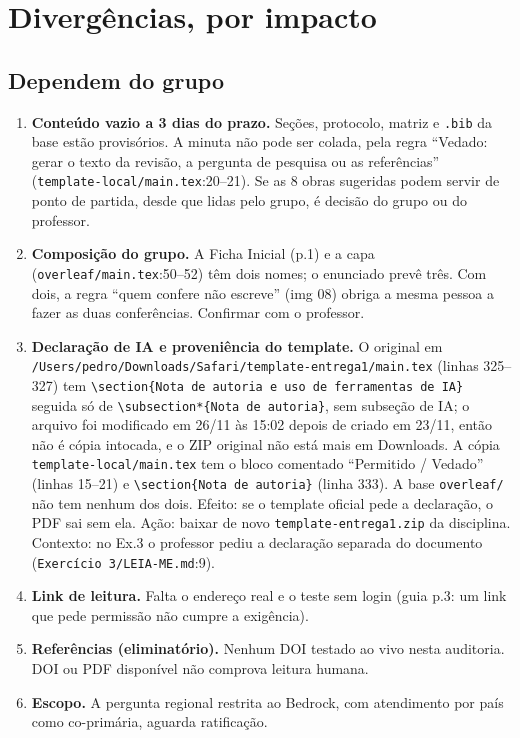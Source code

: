 \documentclass[11pt,a4paper]{article}
\newcommand{\arq}[1]{\nolinkurl{#1}}
\begin{document}
\section{Divergências, por impacto}

\subsection*{Dependem do grupo}

\begin{enumerate}
\item \textbf{Conteúdo vazio a 3 dias do prazo.} Seções, protocolo, matriz e \texttt{.bib} da base estão provisórios. A minuta não pode ser colada, pela regra ``Vedado: gerar o texto da revisão, a pergunta de pesquisa ou as referências'' (\arq{template-local/main.tex}:20--21). Se as 8 obras sugeridas podem servir de ponto de partida, desde que lidas pelo grupo, é decisão do grupo ou do professor.
\item \textbf{Composição do grupo.} A Ficha Inicial (p.1) e a capa (\arq{overleaf/main.tex}:50--52) têm dois nomes; o enunciado prevê três. Com dois, a regra ``quem confere não escreve'' (img 08) obriga a mesma pessoa a fazer as duas conferências. Confirmar com o professor.
\item \textbf{Declaração de IA e proveniência do template.} O original em \arq{/Users/pedro/Downloads/Safari/template-entrega1/main.tex} (linhas 325--327) tem \texttt{\textbackslash section\{Nota de autoria e uso de ferramentas de IA\}} seguida só de \texttt{\textbackslash subsection*\{Nota de autoria\}}, sem subseção de IA; o arquivo foi modificado em 26/11 às 15:02 depois de criado em 23/11, então não é cópia intocada, e o ZIP original não está mais em Downloads. A cópia \arq{template-local/main.tex} tem o bloco comentado ``Permitido / Vedado'' (linhas 15--21) e \texttt{\textbackslash section\{Nota de autoria\}} (linha 333). A base \arq{overleaf/} não tem nenhum dos dois. Efeito: se o template oficial pede a declaração, o PDF sai sem ela. Ação: baixar de novo \arq{template-entrega1.zip} da disciplina. Contexto: no Ex.3 o professor pediu a declaração separada do documento (\arq{Exercício 3/LEIA-ME.md}:9).
\item \textbf{Link de leitura.} Falta o endereço real e o teste sem login (guia p.3: um link que pede permissão não cumpre a exigência).
\item \textbf{Referências (eliminatório).} Nenhum DOI testado ao vivo nesta auditoria. DOI ou PDF disponível não comprova leitura humana.
\item \textbf{Escopo.} A pergunta regional restrita ao Bedrock, com atendimento por país como co-primária, aguarda ratificação.
\end{enumerate}
\end{document}

